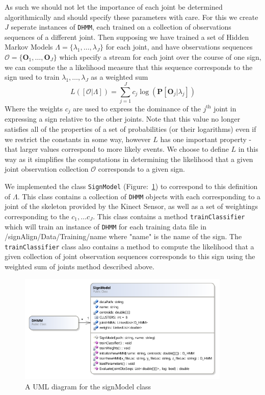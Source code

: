 As such we should not let the importance of each joint be determined algorithmically and should specify these parameters with care. For this we create $J$ seperate instances of \verb|DHMM|, each trained on a collection of observations sequences of a different joint. Then supposing we have trained a set of Hidden Markov Models $\Lambda = \{\lambda_1, \dots, \lambda_J\}$ for each joint, and have observations sequences $\mathcal{O} = \{\mathbf{O}_1,\dots, \mathbf{O}_J\}$ which specify a stream for each joint over the course of one sign, we can compute the a likelihood measure that this sequence corresponds to the sign used to train $\lambda_1, \dots, \lambda_J$ as a weighted sum
\begin{equation*}
L([\mathcal{O} | \Lambda ]) = \sum_{j=1}^{J} c_j \log(\mathbf{P}[\mathbf{O}_j | \lambda_j])
\end{equation*}
Where the weights $c_j$ are used to express the dominance of the $j^\text{th}$ joint in expressing a sign relative to the other joints. Note that this value no longer satisfies all of the properties of a set of probabilities (or their logarithms) even if we restrict the constants in some way, however $L$ has one important property - that larger values correspond to more likely events. We choose to define $L$ in this way as it simplifies the computations in determining the likelihood that a given joint observation collection $\mathcal{O}$ corresponds to a given sign.

We implemented the class \verb|SignModel| (Figure:~\ref{fig:signModel}) to correspond to this definition of $\Lambda$. This class contains a collection of \verb|DHMM| objects with each corresponding to a joint of the skeleton provided by the Kinect Sensor, as well as a set of weightings corresponding to the $c_1, \dots c_J$. This class contains a method \verb|trainClassifier| which will train an instance of \verb|DHMM| for each training data file in /signAlign/Data/Training/name where "name" is the name of the sign. The \verb|trainClassifier| class also contains a method to compute the likelihood that a given collection of joint observation sequences corresponds to this sign using the weighted sum of joints method described above.
\begin{figure}
        \centering
        \includegraphics[width=0.9\textwidth]{ThesisFigs/signModelDiag}
        \caption{A UML diagram for the signModel class}\label{fig:signModel}
\end{figure}

